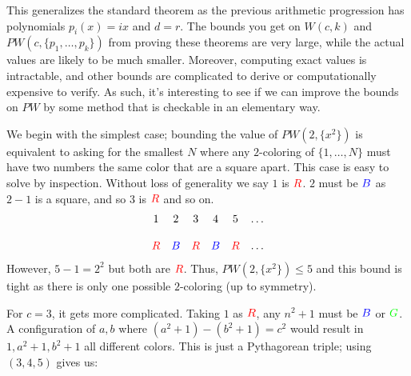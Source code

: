 \documentclass[a4paper]{amsproc}
\theoremstyle{plain}
\theoremstyle{named}
\newcommand{\RR} {\color{red} R}
\newcommand{\BB} {\color{blue} B}
\newcommand{\GG} {\color{green} G}
\begin{document}
This generalizes the standard theorem as the previous arithmetic progression has polynomials $p_i(x) = ix$ and $d=r$.
The bounds you get on $W(c,k)$ and $PW(c,\{p_1,\ldots,p_k\})$ from proving these theorems are very large,
while the actual values are likely to be much smaller.
Moreover, computing exact values is intractable, and other bounds are complicated to derive or computationally expensive to verify.
As such, it's interesting to see if we can improve the bounds on $PW$ by some method that is checkable in an elementary way.


We begin with the simplest case; bounding the value of $PW(2,\{x^2\})$ is equivalent to asking for the smallest $N$ where any $2$-coloring of $\{1,\ldots,N\}$ must have two numbers the same color that are a square apart.
This case is easy to solve by inspection.
Without loss of generality we say $1$ is $\RR$.
$2$ must be $\BB$ as $2-1$ is a square, and so $3$ is $\RR$ and so on.
\[\begin{matrix}1&2&3&4&5&\ldots\\\\\RR&\BB&\RR&\BB&\RR&\ldots\end{matrix}\]
However, $5-1=2^2$ but both are $\RR$.
Thus, $PW(2,\{x^2\})\leq 5$ and this bound is tight as there is only one possible $2$-coloring (up to symmetry).

For $c=3$, it gets more complicated.
Taking $1$ as $\RR$, any $n^2+1$ must be $\BB$ or $\GG$.
A configuration of $a,b$ where $(a^2+1)-(b^2+1)=c^2$ would result in $1, a^2+1, b^2+1$ all different colors.
This is just a Pythagorean triple; using $(3,4,5)$ gives us:

\begin{figure}[H]
\caption{}
\label{fig:M0}
\end{figure}
\end{document}
